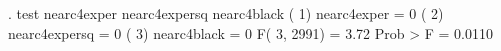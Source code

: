 . test nearc4exper nearc4expersq nearc4black
{\smallskip}
 ( 1)  nearc4exper = 0
 ( 2)  nearc4expersq = 0
 ( 3)  nearc4black = 0
{\smallskip}
       F(  3,  2991) =    3.72
            Prob > F =    0.0110
{\smallskip}
